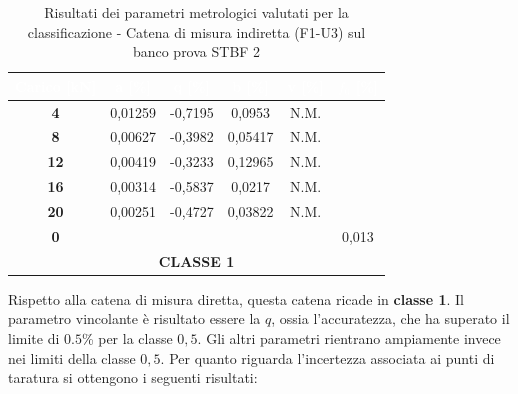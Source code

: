 \documentclass[a4paper, twoside]{article}
\begin{document}
\begin{table}[H]
    \centering
    \renewcommand{\arraystretch}{1.3}
    \begin{tabular}{|c|c|c|c|c|c|}
        \hline
        \rowcolor{headerblue}
        \textcolor{white}{\textbf{Carico [kN]}} & \textcolor{white}{\textbf{a [\%]}} & \textcolor{white}{\textbf{q [\%]}} & \textcolor{white}{\textbf{b [\%]}} & \textcolor{white}{\textbf{v [\%]}} & \textcolor{white}{\textbf{$f_0$ [\%]}} \\
        \hline
        \rowcolor{rowlight}
        \textbf{4} & 0,01259 & -0,7195 & 0,0953 & N.M. & \\
        \hline
        \textbf{8} & 0,00627 & -0,3982 & 0,05417 & N.M. & \\
        \hline
        \rowcolor{rowlight}
        \textbf{12} & 0,00419 & -0,3233 & 0,12965 & N.M. & \\
        \hline
        \textbf{16} & 0,00314 & -0,5837 & 0,0217 & N.M. & \\
        \hline
        \rowcolor{rowlight}
        \textbf{20} & 0,00251 & -0,4727 & 0,03822 & N.M. & \\
        \hline
        \textbf{0} & & & & & 0,013 \\
        \hline
        \multicolumn{6}{|c|}{\textbf{CLASSE 1}} \\
        \hline
    \end{tabular}
    \caption{Risultati dei parametri metrologici valutati per la classificazione - Catena di misura indiretta (F1-U3) sul banco prova STBF 2}
    \label{tab:risultati_parametri_stbf_f1_u3}
\end{table}

Rispetto alla catena di misura diretta, questa catena ricade in \textbf{classe 1}. Il parametro vincolante è risultato essere la $q$, ossia l'accuratezza, che ha superato il limite di $0.5$\% per la classe $0,5$. Gli altri parametri rientrano ampiamente invece nei limiti della classe $0,5$. Per quanto riguarda l'incertezza associata ai punti di taratura si ottengono i seguenti risultati:
\end{document}
